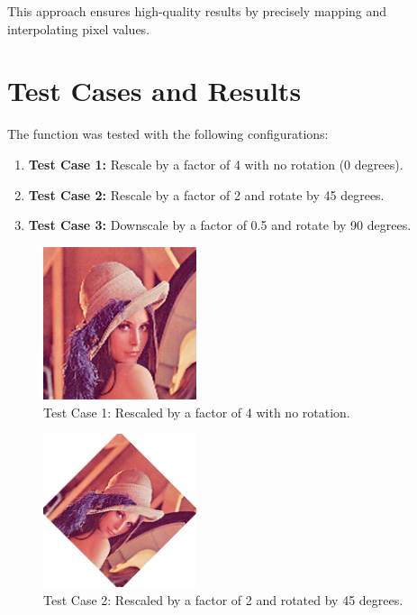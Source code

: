 \documentclass{article}
\begin{document}
This approach ensures high-quality results by precisely mapping and interpolating pixel values.

\section{Test Cases and Results}

The function was tested with the following configurations:
\begin{enumerate}
    \item \textbf{Test Case 1:} Rescale by a factor of 4 with no rotation (0 degrees).
    \item \textbf{Test Case 2:} Rescale by a factor of 2 and rotate by 45 degrees.
    \item \textbf{Test Case 3:} Downscale by a factor of 0.5 and rotate by 90 degrees.
\end{enumerate}

\begin{figure}[h!]
    \centering
    \includegraphics[width=0.4\textwidth]{lena_4.00@0.00.png}
    \caption{Test Case 1: Rescaled by a factor of 4 with no rotation.}
\end{figure}

\begin{figure}[h!]
    \centering
    \includegraphics[width=0.4\textwidth]{lena_2.00@45.00.png}
    \caption{Test Case 2: Rescaled by a factor of 2 and rotated by 45 degrees.}
\end{figure}
\end{document}
